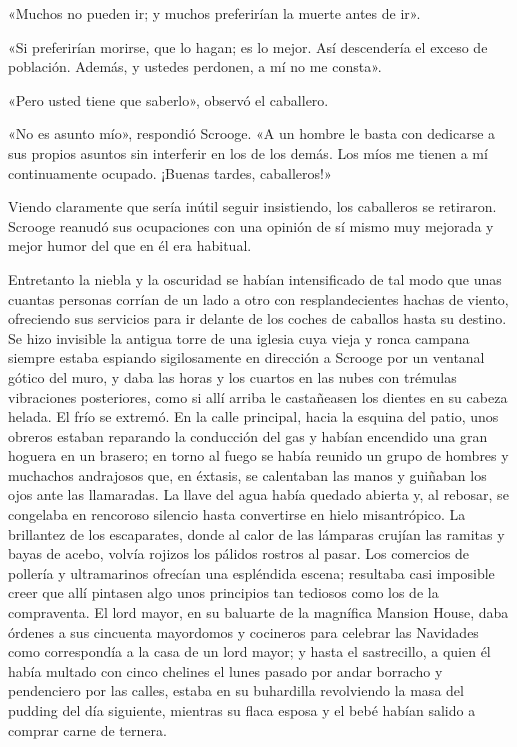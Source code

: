 \documentclass{novela}
\begin{document}
 «Muchos no pueden ir; y muchos preferirían la muerte antes de ir».

 «Si preferirían morirse, que lo hagan; es lo mejor. Así descendería el exceso de población. Además, y ustedes perdonen, a mí no me consta».

 «Pero usted tiene que saberlo», observó el caballero.

 «No es asunto mío», respondió Scrooge. «A un hombre le basta con dedicarse a sus propios asuntos sin interferir en los de los demás. Los míos me tienen a mí continuamente ocupado. ¡Buenas tardes, caballeros!»

 Viendo claramente que sería inútil seguir insistiendo, los caballeros se retiraron. Scrooge reanudó sus ocupaciones con una opinión de sí mismo muy mejorada y mejor humor del que en él era habitual.

 Entretanto la niebla y la oscuridad se habían intensificado de tal modo que unas cuantas personas corrían de un lado a otro con resplandecientes hachas de viento, ofreciendo sus servicios para ir delante de los coches de caballos hasta su destino. Se hizo invisible la antigua torre de una iglesia cuya vieja y ronca campana siempre estaba espiando sigilosamente en dirección a Scrooge por un ventanal gótico del muro, y daba las horas y los cuartos en las nubes con trémulas vibraciones posteriores, como si allí arriba le castañeasen los dientes en su cabeza helada. El frío se extremó. En la calle principal, hacia la esquina del patio, unos obreros estaban reparando la conducción del gas y habían encendido una gran hoguera en un brasero; en torno al fuego se había reunido un grupo de hombres y muchachos andrajosos que, en éxtasis, se calentaban las manos y guiñaban los ojos ante las llamaradas. La llave del agua había quedado abierta y, al rebosar, se congelaba en rencoroso silencio hasta convertirse en hielo misantrópico. La brillantez de los escaparates, donde al calor de las lámparas crujían las ramitas y bayas de acebo, volvía rojizos los pálidos rostros al pasar. Los comercios de pollería y ultramarinos ofrecían una espléndida escena; resultaba casi imposible creer que allí pintasen algo unos principios tan tediosos como los de la compraventa. El lord mayor, en su baluarte de la magnífica Mansion House, daba órdenes a sus cincuenta mayordomos y cocineros para celebrar las Navidades como correspondía a la casa de un lord mayor; y hasta el sastrecillo, a quien él había multado con cinco chelines el lunes pasado por andar borracho y pendenciero por las calles, estaba en su buhardilla revolviendo la masa del pudding del día siguiente, mientras su flaca esposa y el bebé habían salido a comprar carne de ternera.
\end{document}
